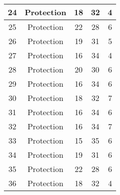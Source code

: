 \documentclass[results.tex]{subfiles}
\begin{document}
\begin{center}
\begin{tabular}{| c || c | c | c | c |}
            \hline
            24                      & Protection                   & 18                     & 32                      & 4                    \\
            \hline
            25                      & Protection                   & 22                     & 28                      & 6                    \\
            \hline
            26                      & Protection                   & 19                     & 31                      & 5                    \\
            \hline
            27                      & Protection                   & 16                     & 34                      & 4                    \\
            \hline
            28                      & Protection                   & 20                     & 30                      & 6                    \\
            \hline
            29                      & Protection                   & 16                     & 34                      & 6                    \\
            \hline
            30                      & Protection                   & 18                     & 32                      & 7                    \\
            \hline
            31                      & Protection                   & 16                     & 34                      & 6                    \\
            \hline
            32                      & Protection                   & 16                     & 34                      & 7                    \\
            \hline
            33                      & Protection                   & 15                     & 35                      & 6                    \\
            \hline
            34                      & Protection                   & 19                     & 31                      & 6                    \\
            \hline
            35                      & Protection                   & 22                     & 28                      & 6                    \\
            \hline
            36                      & Protection                   & 18                     & 32                      & 4                    \\

\end{tabular}
\end{center}
\end{document}
